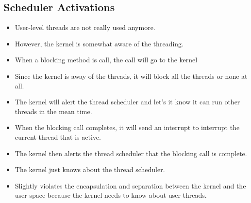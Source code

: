 \documentclass[]{article}
\begin{document}
\subsection{Scheduler Activations}
\begin{itemize}
\item User-level threads are not really used anymore.
\item However, the kernel is somewhat aware of the threading.
\item When a blocking method is call, the call will go to the kernel
\item Since the kernel is away of the threads, it will block all the threads or
none at all.
\item The kernel will alert the thread scheduler and let's it know it can run
other threads in the mean time.
\item When the blocking call completes, it will send an interrupt to interrupt
the current thread that is active.
\item The kernel then alerts the thread scheduler that the blocking call is
complete.
\item The kernel just knows about the thread scheduler.
\item Slightly violates the encapsulation and separation between the kernel and
the user space because the kernel needs to know about user threads.
\end{itemize}
\end{document}
